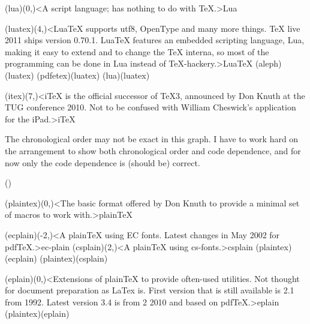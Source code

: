 {	\tonode[\program](lua)(0,\layer)<A script language; has nothing to do with TeX.>{Lua}
	
	\tonode[\vip](luatex)(4,\layer)<LuaTeX supports utf8, OpenType and many more things. TeX live 2011 ships version 0.70.1. LuaTeX features an embedded scripting language, Lua, making it easy to extend and to change the TeX interna, so most of the programming can be done in Lua instead of TeX-hackery.>{Lua\TeX}
		\todraw(aleph)(luatex)
		\todraw*(pdfetex)(luatex)
		\todraw[dashed](lua)(luatex)
	
	\steplayer[-3]
	\tonode[\experimental](itex)(7,\layer)<iTeX is the official successor of TeX3, announced by Don Knuth at the TUG conference 2010. Not to be confused with William Cheswick's application for the iPad.>{i\TeX}
}
\vfill

{\flushleft The chronological order may not be exact in this graph. I have to work hard on the arrangement to show both chronological order and code dependence, and for now only the code dependence is (should be) correct.

} 

\clearpage

\tograph(){
	\tonode(plaintex)(0,\layer)<The basic format offered by Don Knuth to provide a minimal set of macros to work with.>{plain\TeX}
\steplayer[-2]

	\tonode[\experimental](ecplain)(-2,\layer)<A plainTeX using EC fonts. Latest changes in May 2002 for pdfTeX.>{ec-plain}
	\tonode[\experimental](csplain)(2,\layer)<A plainTeX using cs-fonts.>{csplain}
	\todraw(plaintex)(ecplain)
	\todraw(plaintex)(csplain)

\steplayer[-2]
	\tonode[\experimental](eplain)(0,\layer)<Extensions of plainTeX to provide often-used utilities. Not thought for document preparation as LaTex is. First version that is still available is 2.1 from 1992. Latest version 3.4 is from 2 2010 and based on pdfTeX.>{eplain}
	\todraw(plaintex)(eplain)
}
\clearpage

